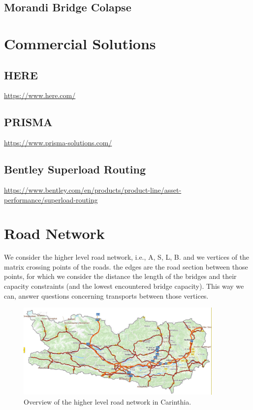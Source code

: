 \cite{wankmuller2020coordination}

\subsection{Morandi Bridge Colapse}

\cite{Morgese.2020}
\cite{MorandiNYTimes}


\section{Commercial Solutions}

\subsection{HERE}
\url{https://www.here.com/}
\subsection{PRISMA}
\url{https://www.prisma-solutions.com/}

\subsection{Bentley Superload Routing}
\url{https://www.bentley.com/en/products/product-line/asset-performance/superload-routing}



\section{Road Network}

We consider the higher level road network, i.e., A, S, L, B.
and we vertices of the matrix crossing points of the roads.
the edges are the road section between those points, for which we
consider the distance the length of the bridges and their capacity constraints (and the lowest encountered bridge capacity).
This way we can, answer questions concerning transports between those vertices.

\begin{figure}
 \centering
  \includegraphics[width=0.9\textwidth]{map.jpg}
  \caption{Overview of the higher level road network in Carinthia.}
  \label{fig:higher level}
\end{figure}
